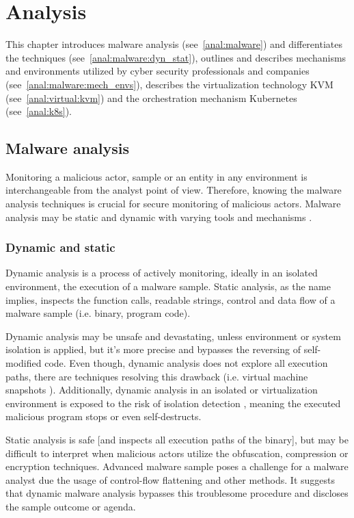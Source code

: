 \chapter{Analysis \label{anal}}
This chapter introduces malware analysis (see~\autoref{anal:malware}) and differentiates the techniques (see~\autoref{anal:malware:dyn_stat}), outlines and describes mechanisms and environments utilized by cyber security professionals and companies (see~\autoref{anal:malware:mech_envs}), describes the virtualization technology KVM (see~\autoref{anal:virtual:kvm}) and the orchestration mechanism Kubernetes (see~\autoref{anal:k8s}).

\section{Malware analysis \label{anal:malware}}
Monitoring a malicious actor, sample or an entity in any environment is interchangeable from the analyst point of view. Therefore, knowing the malware analysis techniques is crucial for secure monitoring of malicious actors. Malware analysis may be static and dynamic with varying tools and mechanisms \cite{article:malware_analysis_techniques} \cite{research:malware_analysis_2017}.

\subsection{Dynamic and static \label{anal:malware:dyn_stat}}
Dynamic analysis is a process of actively monitoring, ideally in an isolated environment, the execution of a malware sample. Static analysis, as the name implies, inspects the function calls, readable strings, control and data flow of a malware sample (i.e. binary, program code).

Dynamic analysis may be unsafe and devastating, unless environment or system isolation is applied, but it's more precise and bypasses the reversing of self-modified code. Even though, dynamic analysis does not explore all execution paths, there are techniques resolving this drawback (i.e. virtual machine snapshots \cite{research:malware_analysis_2017}). Additionally, dynamic analysis in an isolated or virtualization environment is exposed to the risk of isolation detection \cite{medium_article:malware_analysis_sandboxing}, meaning the executed malicious program stops or even self-destructs.

Static analysis is safe [and inspects all execution paths of the binary], but may be difficult to interpret when malicious actors utilize the obfuscation, compression or encryption techniques. Advanced malware sample poses a challenge for a malware analyst due the usage of control-flow flattening \cite{report:eset_static_analysis} and other methods. It suggests that dynamic malware analysis bypasses this troublesome procedure and discloses the sample outcome or agenda.

